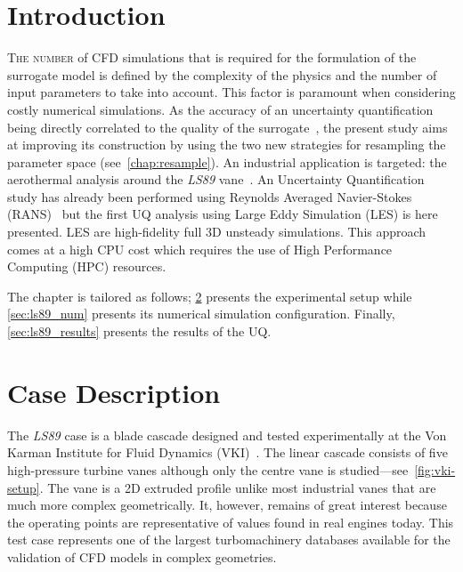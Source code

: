 \section{Introduction}

\lettrine{T}{he number} of CFD simulations that is required for the formulation of the surrogate model is defined by the complexity of the physics and the number of input parameters to take into account. This factor is paramount when considering costly numerical simulations. As the accuracy of an uncertainty quantification being directly correlated to the quality of the surrogate~\cite{iooss2010}, the present study aims at improving its construction by using the two new strategies for resampling the parameter space (see~\cref{chap:resample}). An industrial application is targeted: the aerothermal analysis around the \textit{LS89} vane~\cite{arts1990}. An Uncertainty Quantification study has already been performed using Reynolds Averaged Navier-Stokes (RANS)~\cite{Gourdain2010,emory2016} but the first UQ analysis using Large Eddy Simulation (LES) is here presented. LES are high-fidelity full 3D unsteady simulations. This approach comes at a high CPU cost which requires the use of High Performance Computing (HPC) resources.

The chapter is tailored as follows; \cref{sec:ls89_case} presents the experimental setup while \cref{sec:ls89_num} presents its numerical simulation configuration. Finally, \cref{sec:ls89_results}  presents the results of the UQ.

\section{Case Description}\label{sec:ls89_case}
The \textit{LS89} case is a blade cascade designed and tested experimentally at the Von Karman Institute for Fluid Dynamics (VKI)~\cite{arts1990}. The linear cascade consists of five high-pressure turbine vanes although only the centre vane is studied---see~\cref{fig:vki-setup}. The vane is a 2D extruded profile unlike most industrial vanes that are much more complex geometrically. It, however, remains of great interest because the operating points are representative of values found in real engines today. This test case represents one of the largest turbomachinery databases available for the validation of CFD models in complex geometries.

